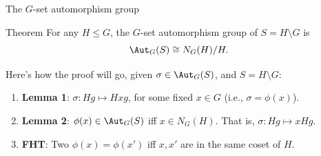 \documentclass[8pt, handout]{beamer}
\begin{document}
\begin{frame}{The $G$-set automorphism group} \vspace{-4mm}
  
  \begin{block}{Theorem}
    For any $H\leq G$, the $G$-set automorphism group of $S=H\!\setminus\!G$ is
    \[
    \Aut_G(S)\cong N_G(H)/H.
    \]
  \end{block}

  \medskip
  
  Here's how the proof will go, given $\sigma\in\Aut_G(S)$, and
  $S=H\!\setminus\!G$:
  \begin{enumerate}
  \item \textbf{Lemma 1}: $\sigma\colon Hg\mapsto Hxg$, for some fixed
    $x\in G$ (i.e., $\sigma=\phi(x)$). \smallskip
  \item \textbf{Lemma 2}: $\phi(x)\in\Aut_G(S)$ iff
    $x\in N_G(H)$. That is, $\sigma\colon Hg\mapsto xHg$. \smallskip
  \item \textbf{FHT}: Two $\phi(x)=\phi(x')$ iff $x,x'$ are in the
    same coset of $H$.
  \end{enumerate}


\end{frame}
\end{document}
